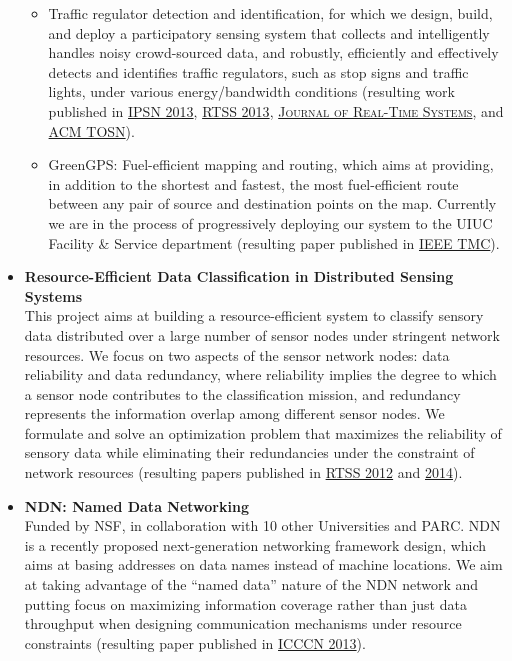 \begin{itemize}
\begin{itemize}
\item Traffic regulator detection and identification, for which we design, build, and deploy a participatory sensing system that collects and intelligently handles noisy crowd-sourced data, and robustly, efficiently and effectively detects and identifies traffic regulators, such as stop signs and traffic lights, under various energy/bandwidth conditions (resulting work published in \hyperlink{hu2013ipsn}{\textsc{IPSN 2013}}, \hyperlink{wang2013rtss}{\textsc{RTSS 2013}}, \hyperlink{wang2015jrts}{\textsc{Journal of Real-Time Systems}}, and \hyperlink{hu2015tosn}{\textsc{ACM TOSN}}).

\item GreenGPS: Fuel-efficient mapping and routing, which aims at providing, in addition to the shortest and fastest, the most fuel-efficient route between any pair of source and destination points on the map. Currently we are in the process of progressively deploying our system to the UIUC Facility \& Service department (resulting paper published in \hyperlink{saremi2015tmc}{\textsc{IEEE TMC}}).
\end{itemize}

\item \textbf{Resource-Efficient Data Classification in Distributed Sensing Systems} \\
This project aims at building a resource-efficient system to classify sensory data distributed over a large number of sensor nodes under stringent network resources. We focus on two aspects of the sensor network nodes: data reliability and data redundancy, where reliability implies the degree to which a sensor node contributes to the classification mission, and redundancy represents the information overlap among different sensor nodes. We formulate and solve an optimization problem that maximizes the reliability of sensory data while eliminating their redundancies under the constraint of network resources (resulting papers published in \hyperlink{su2012rtss}{\textsc{RTSS 2012}} and \hyperlink{su2014rtss}{\textsc{2014}}).

\item \textbf{NDN: Named Data Networking} \\
Funded by NSF, in collaboration with 10 other Universities and PARC. NDN is a recently proposed next-generation networking framework design, which aims at basing addresses on data names instead of machine locations. We aim at taking advantage of the ``named data'' nature of the NDN network and putting focus on maximizing information coverage rather than just data throughput when designing communication mechanisms under resource constraints (resulting paper published in \hyperlink{wang2013icccn}{\textsc{ICCCN 2013}}).

\end{itemize}

